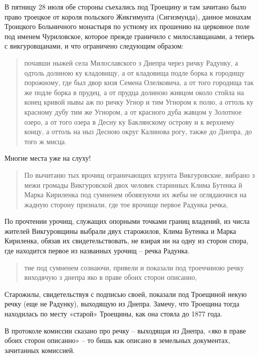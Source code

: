 В пятницу 28 июля обе стороны съехались под Троещину и там зачитано было право троецкое от короля польского Жикгимунта (Сигизмунда), данное монахам Троицкого Больничного монастыря по устному их прошению на церковное поле под именем Чуриловское, которое прежде граничило с милославщанами, а теперь с викгуровщанами, и что ограничено следующим образом:

\begin{quotation}
почавши ныжей села Милославского з Днепра через ричку Радунку, а одтоль долиною ку кладовищу, а от кладовища подле борка к городищу порожному, где был двор кнзя Семена Олелковича, а от того городища так же подле борка в прудец, а от прудца долиною живцом около стойла на конец кривой нывы аж по ричку Угнор и тим Угнором к полю, а оттоль ку красному дубу тим же Угнором, а от красного дуба жавцом у Золотное озеро, а от того озера в Десну ку Баклянскому острову и к верхнему концу, а оттоль на ныз Десною округ Калинова рогу, также до Днепра, до того ж мисца. 
\end{quotation}

Многие места уже на слуху!

\begin{quotation}
По вычитаню тых врочищ ограничающих кгрунта Викгуровские, вибрано з межи громады Викгуровской двох человек старинных Клима Бутенка й Марка Кириленка под сумненем обовязуючи их жебы не оглядаючися на жадную сторону признали, где тое врочище первое Радунка речка,
\end{quotation}

По прочтении урочищ, служащих опорными точками границ владений, из числа жителей Викгуровщины выбрали двух старожилов, Клима Бутенка и Марка Кириленка, обязав их свидетельствовать, не взирая ни на одну из сторон спора, где находится первое из названных урочищ – речка Радунка.

\begin{quotation}
тие под сумненем сознаючи, привели и показали под троеччиною речку виходячую з днепра яко в праве обоих сторон описанно, 
\end{quotation}

Старожилы, свидетельствуя с подписью своей, показали под Троещиной некую речку (еще не Радунку), выходящую из Днепра. Замечу, что Троещина тогда находилась по месту «старой» Троещины, как она стояла до 1877 года.

В протоколе комиссии сказано про речку – выходящая из Днепра, «яко в праве обоих сторон описанно» – то бишь как описано в земельных документах, зачитанных комиссией.

